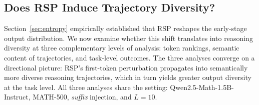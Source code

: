 \subsection{Does RSP Induce Trajectory Diversity?}\label{sec:diversity}

Section~\ref{sec:entropy} empirically established that RSP reshapes the early-stage output distribution. We now examine whether this shift translates into reasoning diversity at three complementary levels of analysis: token rankings, semantic content of trajectories, and task-level outcomes. The three analyses converge on a directional picture: RSP's first-token perturbation propagates into semantically more diverse reasoning trajectories, which in turn yields greater output diversity at the task level. All three analyses share the setting: Qwen2.5-Math-1.5B-Instruct, MATH-500, \emph{suffix} injection, and $L=10$.

